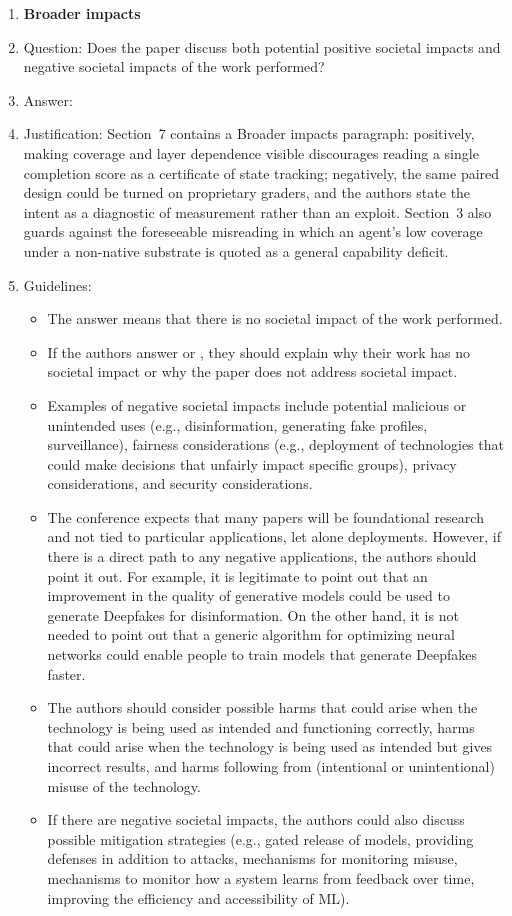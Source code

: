 \begin{enumerate}
\item {\bf Broader impacts}
    \item[] Question: Does the paper discuss both potential positive societal impacts and negative societal impacts of the work performed?
    \item[] Answer: \answerYes{}
    \item[] Justification: Section~7 contains a Broader impacts paragraph: positively, making coverage and layer dependence visible discourages reading a single completion score as a certificate of state tracking; negatively, the same paired design could be turned on proprietary graders, and the authors state the intent as a diagnostic of measurement rather than an exploit. Section~3 also guards against the foreseeable misreading in which an agent's low coverage under a non-native substrate is quoted as a general capability deficit.
    \item[] Guidelines:
    \begin{itemize}
        \item The answer \answerNA{} means that there is no societal impact of the work performed.
        \item If the authors answer \answerNA{} or \answerNo, they should explain why their work has no societal impact or why the paper does not address societal impact.
        \item Examples of negative societal impacts include potential malicious or unintended uses (e.g., disinformation, generating fake profiles, surveillance), fairness considerations (e.g., deployment of technologies that could make decisions that unfairly impact specific groups), privacy considerations, and security considerations.
        \item The conference expects that many papers will be foundational research and not tied to particular applications, let alone deployments. However, if there is a direct path to any negative applications, the authors should point it out. For example, it is legitimate to point out that an improvement in the quality of generative models could be used to generate Deepfakes for disinformation. On the other hand, it is not needed to point out that a generic algorithm for optimizing neural networks could enable people to train models that generate Deepfakes faster.
        \item The authors should consider possible harms that could arise when the technology is being used as intended and functioning correctly, harms that could arise when the technology is being used as intended but gives incorrect results, and harms following from (intentional or unintentional) misuse of the technology.
        \item If there are negative societal impacts, the authors could also discuss possible mitigation strategies (e.g., gated release of models, providing defenses in addition to attacks, mechanisms for monitoring misuse, mechanisms to monitor how a system learns from feedback over time, improving the efficiency and accessibility of ML).
    \end{itemize}
    

\end{enumerate}
